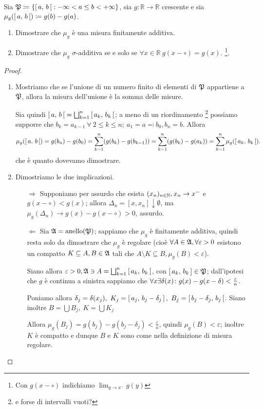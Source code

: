 \documentclass[../EserciziIstituzioniAnalisi.tex]{subfiles}
\begin{document}
\begin{exercise}[2016-10-14]
  Sia $\mathfrak P \coloneqq \left\lbrace \left[\,a,\,b\,\right[: -\infty < a \leq b < +\infty\right\rbrace$, sia $g\colon \mathbb{R} \to \mathbb{R}$ crescente e sia $\mu_g(\left[\,a,\,b\,\right[) \coloneqq g(b) - g(a)$.
  \begin{enumerate}
    \item Dimostrare che $\mu_g$ è una misura finitamente additiva.
    \item Dimostrare che $\mu_g$ $\sigma$-additiva se e solo se $\forall x \in \mathbb{R}\ g(x-\circ) = g(x)$. \footnote{Con $g(x-\circ)$ indichiamo $\lim_{y\to x^{-}}g(y)$}.
  \end{enumerate}
\end{exercise}
\begin{proof}
  \begin{enumerate}
    \item Mostriamo che se l'unione di un numero finito di elementi di $\mathfrak P$ appartiene a $\mathfrak P$, allora la misura dell'unione è la somma delle misure.

    Sia quindi $\left[\,a,\,b\,\right[=\bigsqcup_{k=1}^{n}\left[\,a_k,\,b_k\,\right[$; a meno di un riordinamento \footnote{e forse di intervalli vuoti?} possiamo supporre che
    $b_k=a_{k-1}\ \forall\ 2\leq k\leq n;\ a_1=a\eqqcolon b_0, b_n=b$. Allora
    \begin{equation*}
      \mu_g(\left[\,a,\,b\,\right[)=g(b_n)-g(b_0)=\sum_{k=1}^n (g(b_k)-g(b_{k-1}))=\sum_{k=1}^n (g(b_k)-g(a_k))=\sum_{k=1}^n \mu_g(\left[\,a_k,\,b_k\,\right[).
    \end{equation*}
    che è quanto dovevamo dimostrare.
    \item Dimostriamo le due implicazioni.
    \begin{enumerate}
      \item[$\Rightarrow$] Supponiamo per assurdo che esista $(x_n)_{n\in \mathbb N}, x_n \rightarrow x^-$ e $g(x-\circ) < g(x)$; allora $\Delta_n=[x,x_n]\downarrow\emptyset$, ma $\mu_g(\Delta_n) \rightarrow g(x)-g(x-\circ)>0$, assurdo. 
      \item[$\Leftarrow$] Sia $\mathfrak A=\operatorname{anello}(\mathfrak P)$; sappiamo che $\mu_g$ è finitamente additiva, quindi resta solo da dimostrare che $\mu_g$ è regolare (cioè $\forall A\in \mathfrak A, \forall \varepsilon>0$ esistono un compatto $K \subseteq A, B \in \mathfrak A$ tali che $A\setminus K\subseteq B, \mu_g(B)<\varepsilon$).

      Siano allora $\varepsilon>0, \mathfrak A\ni A=\bigsqcup_{k=1}^n\left[\,a_k,\,b_k\,\right[$, con $\left[\,a_k,\,b_k\,\right]\in \mathfrak P$; dall'ipotesi che $g$ è continua a sinistra sappiamo che $\forall x \exists \delta(x) \colon g(x)-g(x-\delta)<\frac{\varepsilon}{n}$.

      Poniamo allora $\delta_j=\delta(x_j),\ K_j=\icc{a_j}{b_j-\delta_j},\ B_j=\ico{b_j-\delta_j}{b_j}$. Siano inoltre $B=\bigcup B_j,\ K=\bigcup K_j$

      Allora $\mu_g(B_j)=g(b_j)-g(b_j-\delta_j)<\frac{\varepsilon}{n}$, quindi $\mu_g(B)<\varepsilon$; inoltre $K$ è compatto e dunque $B$ e $K$ sono come nella definizione di misura regolare.
    \end{enumerate}
  \end{enumerate}
\end{proof}
\end{document}
